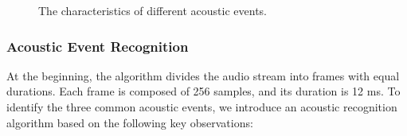 \begin{figure}[!t]
\centering
\caption{The characteristics of different acoustic events.}\label{acoustic}
\end{figure}


\subsubsection*{Acoustic Event Recognition}
 At the beginning, the algorithm divides the audio stream into frames with equal durations. Each frame is composed of 256 samples, and its duration is 12 ms. To identify the three common acoustic events, we introduce an acoustic recognition algorithm based on the following key observations:

